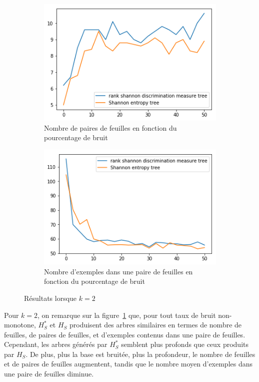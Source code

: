 \documentclass[a4paper]{article}
\newcommand{\figref}[1]{figure~\ref{#1}}
\begin{document}
\begin{figure}[H]
    \begin{subfigure}[c]{0.46\textwidth}
        \centering
        \includegraphics[width=\textwidth]{images/nbpairs_2.png}
        \caption{Nombre de paires de feuilles en fonction du pourcentage de bruit}
    \end{subfigure}
    \begin{subfigure}[c]{0.46\textwidth}
        \centering
        \includegraphics[width=\textwidth]{images/nbexamples_2.png}
        \caption{Nombre d'exemples dans une paire de feuilles en fonction du pourcentage de bruit}
    \end{subfigure}

    \caption{Résultats lorsque $k=2$}
    \label{results:artificial2}
\end{figure}

Pour $k=2$, on remarque sur la \figref{results:artificial2} que, pour tout taux
de bruit non-monotone, $H^*_S$ et $H_S$ produisent des arbres similaires en
termes de nombre de feuilles, de paires de feuilles, et d'exemples contenus dans
une paire de feuilles. Cependant, les arbres générés par $H^*_S$ semblent plus
profonds que ceux produits par $H_S$. De plus, plus la base est bruitée, plus la
profondeur, le nombre de feuilles et de paires de feuilles augmentent, tandis que
le nombre moyen d'exemples dans une paire de feuilles diminue. 
\end{document}
